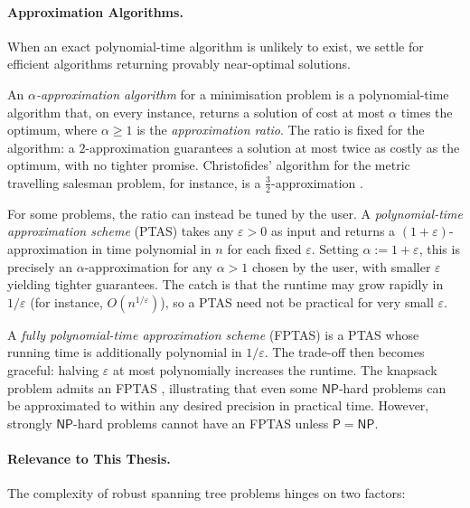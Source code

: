 \paragraph{Approximation Algorithms.}

When an exact polynomial-time algorithm is unlikely to exist, we settle for efficient algorithms returning provably near-optimal solutions.

An \emph{\textcolor{RWTHBlue}{$\alpha$-approximation algorithm}} for a minimisation problem is a polynomial-time algorithm that, on every instance, returns a solution of cost at most $\alpha$ times the optimum, where $\alpha \geq 1$ is the \emph{approximation ratio}.
The ratio is fixed for the algorithm: a $2$-approximation guarantees a solution at most twice as costly as the optimum, with no tighter promise.
Christofides' algorithm for the metric travelling salesman problem, for instance, is a $\tfrac{3}{2}$-approximation \cite[Theorem~21.5]{KorteVygen2018}.

For some problems, the ratio can instead be tuned by the user.
A \emph{\textcolor{RWTHBlue}{polynomial-time approximation scheme}} (PTAS) takes any $\varepsilon > 0$ as input and returns a $(1 + \varepsilon)$-approximation in time polynomial in $n$ for each fixed $\varepsilon$.
Setting $\alpha := 1 + \varepsilon$, this is precisely an $\alpha$-approximation for any $\alpha > 1$ chosen by the user, with smaller $\varepsilon$ yielding tighter guarantees.
The catch is that the runtime may grow rapidly in $1/\varepsilon$ (for instance, $O(n^{1/\varepsilon})$), so a PTAS need not be practical for very small $\varepsilon$.

A \emph{\textcolor{RWTHBlue}{fully polynomial-time approximation scheme}} (FPTAS) is a PTAS whose running time is additionally polynomial in $1/\varepsilon$.
The trade-off then becomes graceful: halving $\varepsilon$ at most polynomially increases the runtime.
The knapsack problem admits an FPTAS \cite[Theorem~17.9]{KorteVygen2018}, illustrating that even some $\mathsf{NP}$-hard problems can be approximated to within any desired precision in practical time.
However, strongly $\mathsf{NP}$-hard problems cannot have an FPTAS unless $\mathsf{P} = \mathsf{NP}$.

\paragraph{Relevance to This Thesis.}

The complexity of robust spanning tree problems hinges on two factors:

